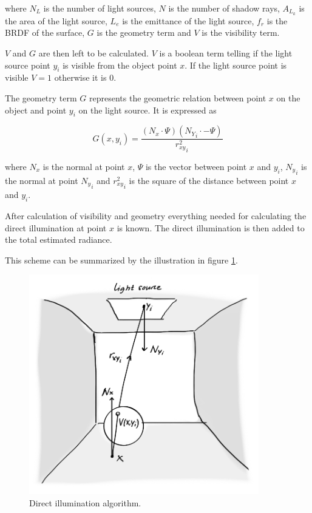 \documentclass[a4paper]{report}
\begin{document}
where \(N_L\) is the number of light sources, \(N\) is the number of
shadow rays, \(A_{L_k}\) is the area
of the light source, \(L_e\) is the emittance of the light source,
\(f_r\) is the BRDF of the surface, \(G\) is the geometry term and \(V\) is the
visibility term.

\(V\) and \(G\) are then left to be calculated. \(V\) is a boolean
term telling if the light source point \(y_i\) is visible from the
object point \(x\). If the light source point is visible \(V = 1\)
otherwise it is \(0\).

The geometry term \(G\) represents the geometric relation between point
\(x\) on the object and point \(y_i\) on the light source. It is
expressed as

\begin{equation}
  G(x,y_i) = \frac{(N_x \cdot \Psi)({N_Y}_i \cdot -\Psi)}{{r^2_{xy}}_i}
  \label{eq:geometry}
\end{equation}

where \(N_x\) is the normal at point \(x\), \(\Psi\) is the vector
between point \(x\) and \(y_i\), \({N_y}_i\) is the normal at point
\({N_y}_i\) and \({r^2_{xy}}_i\) is the square of the distance between
point \(x\) and \(y_i\).

After calculation of visibility and geometry everything needed for
calculating the direct illumination at point \(x\) is known. The
direct illumination is then added to the total estimated radiance.

This scheme can be summarized by the illustration in figure \ref{fig:direct}.

\begin{figure}[h]
  \centering
  \includegraphics[width=10cm]{figures/4}
  \caption{Direct illumination algorithm.}
  \label{fig:direct}
\end{figure}
\end{document}
